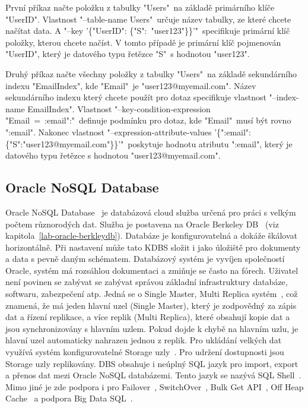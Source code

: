\documentclass[czech,master,dept460,male,csharp,cpdeclaration]{diploma}
\begin{document}
	První příkaz načte položku z tabulky "Users"~na základě primárního klíče "UserID". Vlastnost "--table-name Users"~určuje název tabulky, ze které chcete načítat data. A "--key '\{"UserID": \{"S":~"user123"\}\}'"~specifikuje primární klíč položky, kterou chcete načíst. V tomto případě je primární klíč pojmenován "UserID", který je datového typu řetězce "S"~s hodnotou "user123". 
	
	Druhý příkaz načte všechny položky z tabulky "Users"~na základě sekundárního indexu "EmailIndex", kde "Email"~je "user123@myemail.com". Název sekundárního indexu který chcete použít pro dotaz specifikuje vlastnost "--index-name EmailIndex". Vlastnost "--key-condition-expression "Email~=~:email":"~definuje podmínku pro dotaz, kde "Email"~musí být rovno ":email". Nakonec vlastnost "--expression-attribute-values '\{":email":\{"S":"user123@myemail.com"\}\}'"~poskytuje hodnotu atributu ":email", který je datového typu řetězce s hodnotou "user123@myemail.com".
	
	\subsection{Oracle NoSQL Database}
	
	Oracle NoSQL Database~\cite{oraclenosqldb} je databázová cloud služba určená pro práci s velkým počtem různorodých dat. Služba je postavena na Oracle Berkeley DB~\cite{berkeleydb} (viz kapitola~\ref{lab-oracle-berkleydb}). Databáze je konfigurovatelná a dokáže škálovat horizontálně. Při nastavení může tato KDBS složit i jako úložiště pro dokumenty a data s pevně daným schématem. Databázový systém je vyvíjen společností Oracle, systém má rozsáhlou dokumentaci a zmiňuje se často na fórech. Uživatel není povinen se zabývat se zabývat správou základní infrastruktury databáze, softwaru, zabezpečení atp. Jedná se o Single Master, Multi Replica systém~\cite{oracle-singlemaster-multireplica}, což znamená, že má jeden hlavní uzel (Single Master), který je zodpovědný za zápis dat a řízení replikace, a více replik (Multi Replica), které obsahují kopie dat a jsou synchronizovány s hlavním uzlem. Pokud dojde k chybě na hlavním uzlu, je hlavní uzel automaticky nahrazen jednou z replik. Pro ukládání velkých dat využívá systém konfigurovatelné Storage uzly~\cite{oracle-storage-node}. Pro udržení dostupnosti jsou Storage uzly replikovány. DBS obsahuje i neúplný SQL jazyk pro import, export a přenos dat mezi Oracle NoSQL databázemi. Tento jazyk se nazývá SQL Shell~\cite{oracle-sql-shell}. Mimo jiné je zde podpora i pro Failover~\cite{failover}, SwitchOver~\cite{switchover}, Bulk Get API~\cite{oracle-bulkapi}, Off Heap Cache~\cite{offheapcache} a podpora Big Data SQL~\cite{oracle-big-data-sql}.
	
\end{document}
